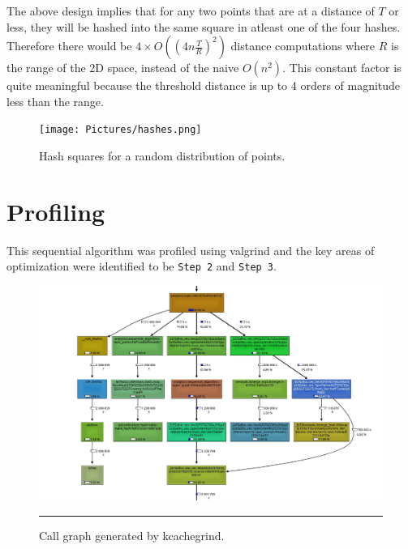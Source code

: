    The above design implies that for any two points that are at a distance of \begin{math} T \end{math} or less, they will be hashed into the same square in atleast one of the four hashes. Therefore there would be \begin{math} {4\times{O({(4n{\frac{T}{R}})}^2)}} \end{math} distance computations where \begin{math} R \end{math} is the range of the 2D space, instead of the naive \begin{math} {O(n^2)} \end{math}. This constant factor is quite meaningful because the threshold distance is up to 4 orders of magnitude less than the range.
\begin{figure}%
	\centering
    \texttt{[image: Pictures/hashes.png]}
    \caption[Profiling]{Hash squares for a random distribution of points.}
	\label{fig:hash}
\end{figure}
\section{Profiling}
This sequential algorithm was profiled using valgrind and the key areas of optimization were identified to be \texttt{Step 2} and \texttt{Step 3}.
\begin{figure}%
    \includegraphics[scale=0.4]{Pictures/profile.png}
		\rule{40em}{0.5pt}
    \caption[Profiling]{Call graph generated by kcachegrind.}
	\label{fig:profile}
\end{figure}

